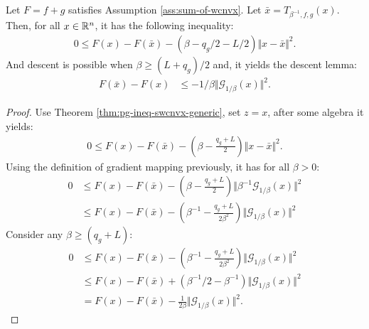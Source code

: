 \documentclass[12pt]{report}
\begin{document}
            \begin{lemma}\;\label{lemma:mono-wcnvx-descent}\\
                Let $F = f + g$ satisfies Assumption \ref{ass:sum-of-wcnvx}. 
                Let $\bar x = T_{\beta^{-1}, f, g}(x)$. 
                Then, for all $x \in \mathbb R^n$, it has the following inequality: 
                $$
                \begin{aligned}
                    0 \le F(x) - F(\bar x) - (\beta - q_g/2 - L/2)\Vert x - \bar x\Vert^2. 
                \end{aligned}
                $$
                And descent is possible when $\beta \ge (L + q_g)/2$ and, it yields the descent lemma: 
                \begin{align*}
                    F(\bar x) - F(x) &\le - 1/\beta \Vert \mathcal G_{1/\beta}(x)\Vert^2. 
                \end{align*}
            \end{lemma}
            \begin{proof}
                Use Theorem \ref{thm:pg-ineq-swcnvx-generic}, set $z = x$, after some algebra it yields: 
                \begin{align*}
                    0 \le F(x) - F(\bar x) - \left(
                        \beta - \frac{q_g + L}{2}
                    \right)\Vert x - \bar x\Vert^2. 
                \end{align*}
                Using the definition of gradient mapping previously, it has for all $\beta > 0$: 
                \begin{align*}
                    0 &\le F(x) - F(\bar x) - \left(
                        \beta - \frac{q_g + L}{2}
                    \right)\Vert \beta^{-1}\mathcal G_{1/\beta}(x) \Vert^2
                    \\
                    &\le F(x) - F(\bar x) - \left(
                        \beta^{-1} - \frac{q_g + L}{2\beta^2}
                    \right)\Vert\mathcal G_{1/\beta}(x) \Vert^2
                \end{align*}
                Consider any $\beta \ge (q_g + L)$: 
                \begin{align*}
                    0 &\le F(x) - F(\bar x) - \left(
                        \beta^{-1} - \frac{q_g + L}{2\beta^2}
                    \right)\Vert\mathcal G_{1/\beta}(x) \Vert^2
                    \\
                    &\le F(x) - F(\bar x) + \left(
                        \beta^{-1}/2 - \beta^{-1}
                    \right)\Vert\mathcal G_{1/\beta}(x) \Vert^2
                    \\
                    &= 
                    F(x) - F(\bar x) - \frac{1}{2\beta}\Vert\mathcal G_{1/\beta}(x) \Vert^2. 
                \end{align*}
            \end{proof}
\end{document}
